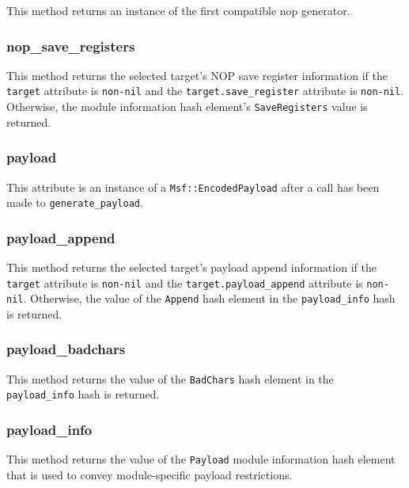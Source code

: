 \documentclass{report}
\begin{document}
\par
This method returns an instance of the first compatible nop
generator.

            \subsubsection{nop\_save\_registers}

\par
This method returns the selected target's NOP save register
information if the \texttt{target} attribute is \texttt{non-nil} and
the \texttt{target.save\_register} attribute is \texttt{non-nil}.
Otherwise, the module information hash element's
\texttt{SaveRegisters} value is returned.

            \subsubsection{payload}

\par
This attribute is an instance of a \texttt{Msf::EncodedPayload}
after a call has been made to \texttt{generate\_payload}.

            \subsubsection{payload\_append}

\par
This method returns the selected target's payload append information
if the \texttt{target} attribute is \texttt{non-nil} and the
\texttt{target.payload\_append} attribute is \texttt{non-nil}.
Otherwise, the value of the \texttt{Append} hash element in the
\texttt{payload\_info} hash is returned.

            \subsubsection{payload\_badchars}

\par
This method returns the value of the \texttt{BadChars} hash element
in the \texttt{payload\_info} hash is returned.

            \subsubsection{payload\_info}

\par
This method returns the value of the \texttt{Payload} module
information hash element that is used to convey module-specific
payload restrictions.
\end{document}
